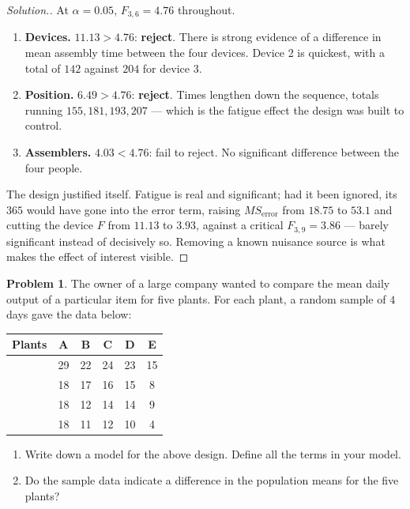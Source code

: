 \documentclass[11pt,a4paper]{article}
\theoremstyle{definition}
\newtheorem{problemx}{Problem}[section]
\newenvironment{problem}{\begin{problemx}}{\end{problemx}}
\newenvironment{solution}
  {\renewcommand{\qedsymbol}{}\begin{proof}[\textit{Solution}.]}
  {\end{proof}}
\begin{document}
\begin{solution}
At $\alpha=0.05$, $F_{3,6}=4.76$ throughout.
\begin{enumerate}
\item[] \textbf{Devices.} $11.13>4.76$: \textbf{reject}. There is strong evidence of a
difference in mean assembly time between the four devices. Device 2 is quickest, with a total
of $142$ against $204$ for device 3.
\item[] \textbf{Position.} $6.49>4.76$: \textbf{reject}. Times lengthen down the sequence,
totals running $155, 181, 193, 207$ --- which is the fatigue effect the design was built to
control.
\item[] \textbf{Assemblers.} $4.03<4.76$: fail to reject. No significant difference between
the four people.
\end{enumerate}

The design justified itself. Fatigue is real and significant; had it been ignored, its $365$
would have gone into the error term, raising $MS_{\text{error}}$ from $18.75$ to
$53.1$ and cutting the device $F$ from $11.13$ to $3.93$, against a critical
$F_{3,9}=3.86$ --- barely significant instead of decisively so. Removing a known nuisance source is what makes the effect of
interest visible.
\end{solution}

\begin{problem}
The owner of a large company wanted to compare the mean daily output of a particular item
for five plants. For each plant, a random sample of $4$ days gave the data below:
\begin{table}[H]
\centering
\begin{tabular}{c|ccccc}
Plants & A & B & C & D & E\\
\hline
& 29 & 22 & 24 & 23 & 15\\
& 18 & 17 & 16 & 15 & 8\\
& 18 & 12 & 14 & 14 & 9\\
& 18 & 11 & 12 & 10 & 4\\
\end{tabular}
\end{table}
\begin{enumerate}
\item[(a).] Write down a model for the above design. Define all the terms in your model.
\item[(b).] Do the sample data indicate a difference in the population means for the five
plants?
\end{enumerate}
\end{problem}
\end{document}
